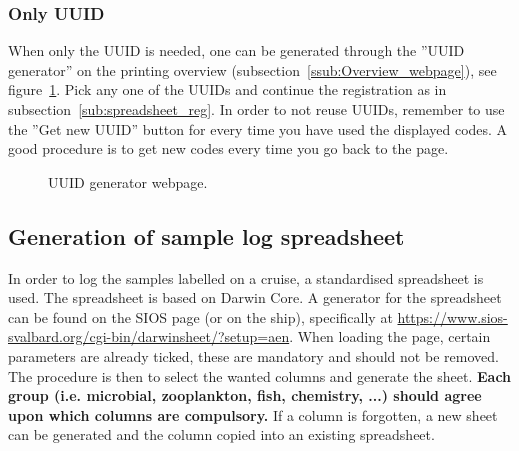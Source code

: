 \documentclass[a4paper,english, 11pt]{article}
\begin{document}
\subsubsection{Only UUID} %
\label{ssub:Only_UUID}

When only the UUID is needed, one can be generated through the ''UUID generator'' on the printing overview (subsection~\ref{ssub:Overview_webpage}), see figure~\ref{fig:uuid_gen}. Pick any one of the UUIDs and continue the registration as in subsection~\ref{sub:spreadsheet_reg}. In order to not reuse UUIDs, remember to use the ''Get new UUID'' button for every time you have used the displayed codes. A good procedure is to get new codes every time you go back to the page.

\begin{figure}[htb]
    \caption{\label{fig:uuid_gen}
        UUID generator webpage.
    }
\end{figure}



\subsection{Generation of sample log spreadsheet} %
\label{sub:Sample_log_spreadsheet_generation}

In order to log the samples labelled on a cruise, a standardised spreadsheet is used. The spreadsheet is based on Darwin Core. A generator for the spreadsheet can be found on the SIOS page (or on the ship), specifically at \url{https://www.sios-svalbard.org/cgi-bin/darwinsheet/?setup=aen}. When loading the page, certain parameters are already ticked, these are mandatory and should not be removed.  
The procedure is then to select the wanted columns and generate the sheet. \textbf{Each group (i.e. microbial, zooplankton, fish, chemistry, ...) should agree upon which columns are compulsory.} If a column is forgotten, a new sheet can be generated and the column copied into an existing spreadsheet.
\end{document}
